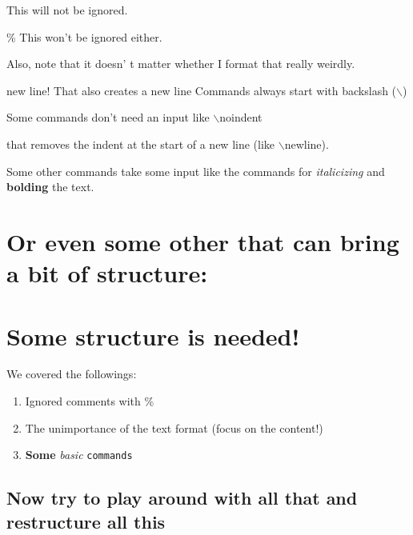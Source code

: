 \documentclass{article} %
\begin{document}


This will not be ignored.

\% This won't be ignored either. %

Also, 
note
that
it doesn'
t
matter                   whether
I
    format that really weirdly.

new line!
\newline
That also creates a new line
\newline
Commands always start with backslash ($\backslash$) %

Some commands don't need an input like $\backslash$noindent %

\noindent that removes the indent at the start of a new line (like $\backslash$newline).


Some other commands take some input like the commands for \textit{italicizing} and \textbf{bolding} the text.
\section{Or even some other that can bring a bit of structure:}
\section{Some structure is needed!}
We covered the followings:

\begin{enumerate} %
\item Ignored comments with \%
\item The unimportance of the text format (focus on the content!)
\item \textbf{Some} \textit{basic} \texttt{commands} %
\end{enumerate}

\subsection*{Now try to play around with all that and restructure all this} %
\end{document}
